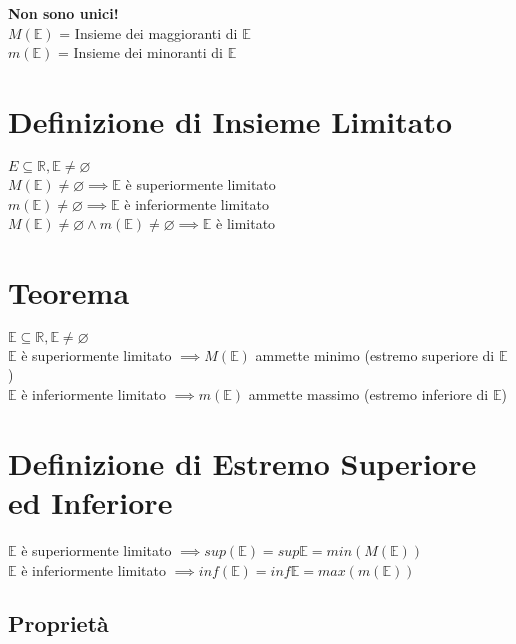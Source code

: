 \documentclass[a4paper, twoside, italian, 11pt]{book}
\newcommand{\R}{\mathbb{R}}
\newcommand{\E}{\mathbb{E}}
\let\emptyset\varnothing
\begin{document}
\noindent
\textbf{Non sono unici!} \\

\noindent
$M(\E)$ = Insieme dei maggioranti di $\E$\\
$m(\E)$ = Insieme dei minoranti di $\E$



\section{Definizione di Insieme Limitato}

\noindent
$E \subseteq \R, \E \neq \emptyset$ \\

\noindent
$M(\E) \neq \emptyset \implies \E$ è superiormente limitato \\
$m(\E) \neq \emptyset \implies \E$ è inferiormente limitato \\
$M(\E) \neq \emptyset \land m(\E) \neq \emptyset \implies \E$ è limitato



\section{Teorema}

\noindent
$\E \subseteq \R, \E \neq \emptyset$ \\

\noindent
$\E$ è superiormente limitato $\implies M(\E)$ ammette minimo (estremo superiore di $\E$) \\

\noindent
$\E$ è inferiormente limitato $\implies m(\E)$ ammette massimo (estremo inferiore di $\E$)




\section{Definizione di Estremo Superiore ed Inferiore}

\noindent
$\E$ è superiormente limitato $\implies sup(\E) = sup \E = min(M(\E))$ \\

\noindent
$\E$ è inferiormente limitato $\implies inf(\E) = inf \E = max(m(\E))$


\subsection{Proprietà}
\end{document}
